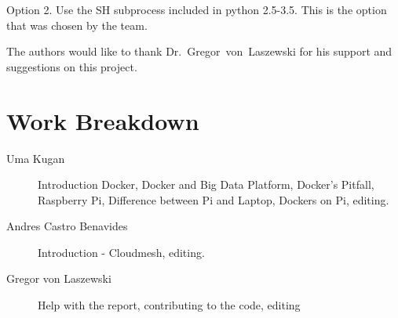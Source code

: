Option 2. Use the SH subprocess included in python 2.5-3.5.  This is
the option that was chosen by the team.
	
	
\begin{acks}
	The authors would like to thank Dr.~Gregor~von~Laszewski for his
  support and suggestions on this project.
\end{acks}
	



	
\newpage
	
\appendix
	
\section{Work Breakdown}
	
\begin{description}
		
		\item[Uma Kugan] Introduction Docker, Docker and Big Data Platform, 
    Docker's Pitfall, Raspberry Pi, Difference between Pi and Laptop,
    Dockers on Pi, editing.
		\item[Andres Castro Benavides] Introduction - Cloudmesh, editing.
		\item[Gregor von Laszewski] Help with the report, contributing to
      the code, editing
		
\end{description}
